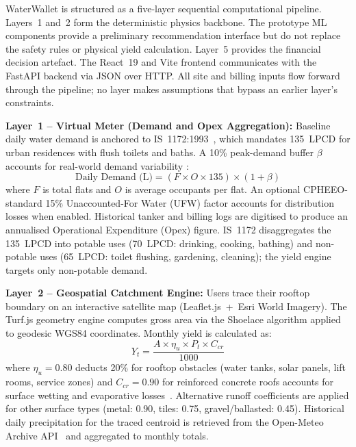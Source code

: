 ﻿\documentclass[conference]{IEEEtran}
\begin{document}
WaterWallet is structured as a five-layer sequential computational pipeline. Layers~1 and~2 form the deterministic physics backbone. The prototype ML components provide a preliminary recommendation interface but do not replace the safety rules or physical yield calculation. Layer~5 provides the financial decision artefact. The React~19 and Vite frontend communicates with the FastAPI backend via JSON over HTTP. All site and billing inputs flow forward through the pipeline; no layer makes assumptions that bypass an earlier layer's constraints.

\textbf{Layer~1 -- Virtual Meter (Demand and Opex Aggregation):}
Baseline daily water demand is anchored to IS~1172:1993~\cite{bis1172}, which mandates 135~LPCD for urban residences with flush toilets and baths. A 10\% peak-demand buffer $\beta$ accounts for real-world demand variability \cite{cpheeo2024}:
\begin{equation}
  \text{Daily Demand (L)} = (F \times O \times 135) \times (1 + \beta)
  \label{eq:demand}
\end{equation}
where $F$ is total flats and $O$ is average occupants per flat. An optional CPHEEO-standard 15\% Unaccounted-For Water (UFW) factor accounts for distribution losses when enabled. Historical tanker and billing logs are digitised to produce an annualised Operational Expenditure (Opex) figure. IS~1172 disaggregates the 135~LPCD into potable uses (70~LPCD: drinking, cooking, bathing) and non-potable uses (65~LPCD: toilet flushing, gardening, cleaning); the yield engine targets only non-potable demand.

\textbf{Layer~2 -- Geospatial Catchment Engine:}
Users trace their rooftop boundary on an interactive satellite map (Leaflet.js~+~Esri World Imagery). The Turf.js geometry engine computes gross area via the Shoelace algorithm applied to geodesic WGS84 coordinates. Monthly yield is calculated as:
\begin{equation}
  Y_t = \frac{A \times \eta_u \times P_t \times C_{cr}}{1000}
  \label{eq:yield}
\end{equation}
where $\eta_u = 0.80$ deducts 20\% for rooftop obstacles (water tanks, solar panels, lift rooms, service zones) and $C_{cr} = 0.90$ for reinforced concrete roofs accounts for surface wetting and evaporative losses~\cite{cpheeo2024}. Alternative runoff coefficients are applied for other surface types (metal: 0.90, tiles: 0.75, gravel/ballasted: 0.45). Historical daily precipitation for the traced centroid is retrieved from the Open-Meteo Archive API~\cite{openmeteo} and aggregated to monthly totals.
\end{document}
